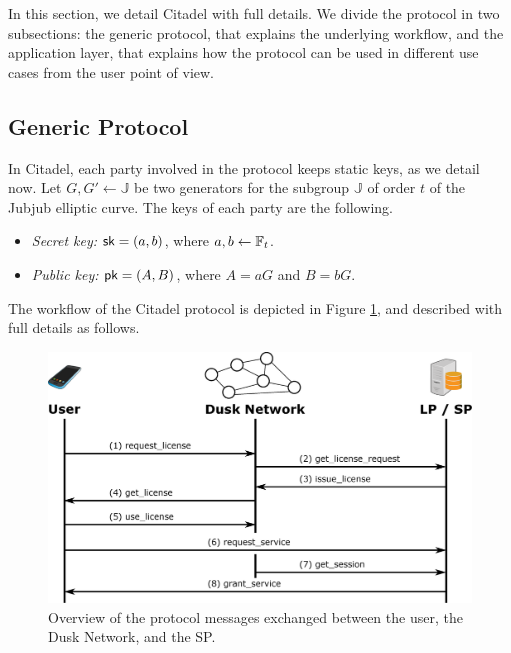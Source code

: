 
In this section, we detail Citadel with full details. We divide the protocol in two subsections: the generic protocol, that explains the underlying workflow, and the application layer, that explains how the protocol can be used in different use cases from the user point of view.

\subsection{Generic Protocol}

In Citadel, each party involved in the protocol keeps static keys, as we detail now. Let $G, G'\gets\mathbb{J}$ be two generators for the subgroup $\mathbb{J}$ of order $t$ of the Jubjub elliptic curve. The keys of each party are the following.

\begin{itemize}%
	\item \textit{Secret key:} $\mathsf{sk} = (a,b)$, where $a,b\gets \mathbb{F}_t$.
	\item \textit{Public key:} $\mathsf{pk} = (A,B)$, where $A = a G$ and $B = b G$.
\end{itemize}

The workflow of the Citadel protocol is depicted in Figure \ref{fig:protocol}, and described with full details as follows.

\begin{figure}[h]
	\centering
		\includegraphics[width=390pt,draft=false]{images/protocol.eps}
	\caption{Overview of the protocol messages exchanged between the user, the Dusk Network, and the SP.}
	\label{fig:protocol}
\end{figure}


